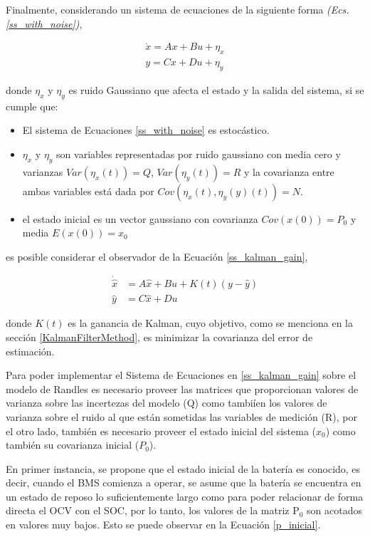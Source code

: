 \documentclass[10pt,a4paper]{article}
\begin{document}
Finalmente, considerando un sistema de ecuaciones de la siguiente forma \emph{(Ecs.
\ref{ss_with_noise})},

\begin{align}
    \dot{x} = Ax + Bu + \eta_x\nonumber\\
    y = Cx + Du + \eta_y\label{ss_with_noise}
\end{align}

donde $\eta_x$ y $\eta_y$ es ruido Gaussiano que afecta el estado y la salida
del sistema, si se cumple que:

\begin{itemize}
    \item El sistema de Ecuaciones \ref{ss_with_noise} es estoc\'astico.
    \item $\eta_x$ y $\eta_y$ son variables representadas por ruido gaussiano
        con media cero y varianzas $Var\left(\eta_x(t)\right) = Q$,
        $Var\left(\eta_y(t)\right) = R$ y la covarianza entre ambas variables
        est\'a dada por $Cov\left(\eta_x(t), \eta_y(y)(t)\right) = N$.
    \item el estado inicial es un vector gaussiano con covarianza
        $Cov\left(x(0)\right) = P_0$ y media $E\left(x(0)\right) = x_0$
\end{itemize}

es posible considerar el observador de la Ecuaci\'on \ref{ss_kalman_gain},

\begin{align}
    \dot{\hat{x}} &= A\hat{x} + Bu + K(t)(y - \hat{y})\nonumber\\
    \hat{y} &= C\hat{x} + Du \label{ss_kalman_gain}
\end{align}

donde $K(t)$ es la ganancia de Kalman, cuyo objetivo, como se menciona en la
secci\'on \ref{KalmanFilterMethod}, es minimizar la covarianza del error de
estimaci\'on. 

\newpage

Para poder implementar el Sistema de Ecuaciones en \ref{ss_kalman_gain} sobre
el modelo de Randles es necesario proveer las matrices que proporcionan valores 
de varianza sobre las incertezas del modelo (Q) como tambi\'ien los valores de
varianza sobre el ruido al que est\'an sometidas las variables de medici\'on
(R), por el otro lado, tambi\'en es necesario proveer el estado inicial del
sistema ($x_0$) como tambi\'en su covarianza inicial ($P_0$).

En primer instancia, se propone que el estado inicial de la bater\'ia es
conocido, es decir, cuando el \acrshort{BMS} comienza a operar, se asume que la
bater\'ia se encuentra en un estado de reposo lo suficientemente largo como para
poder relacionar de forma directa el \acrshort{OCV} con el \acrshort{SOC}, por
lo tanto, los valores de la matriz $\mathrm{P_0}$ son acotados en valores muy
bajos. Esto se puede observar en la Ecuaci\'on \ref{p_inicial}.
\end{document}
